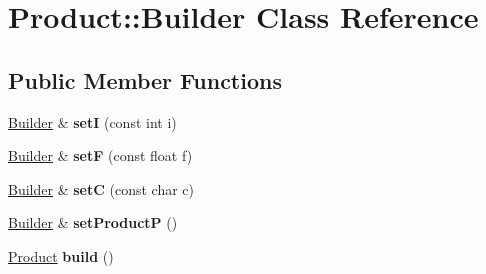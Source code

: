 \hypertarget{class_product_1_1_builder}{\section{Product\-:\-:Builder Class Reference}
\label{class_product_1_1_builder}
}
\subsection*{Public Member Functions}
\begin{DoxyCompactItemize}
\item 
\hypertarget{class_product_1_1_builder_a93ed1ba2502313a485756b7679f58f62}{\hyperlink{class_product_1_1_builder}{Builder} \& {\bfseries set\-I} (const int i)}\label{class_product_1_1_builder_a93ed1ba2502313a485756b7679f58f62}

\item 
\hypertarget{class_product_1_1_builder_ae806626bc173caeb7c2a9f8292a2b7a7}{\hyperlink{class_product_1_1_builder}{Builder} \& {\bfseries set\-F} (const float f)}\label{class_product_1_1_builder_ae806626bc173caeb7c2a9f8292a2b7a7}

\item 
\hypertarget{class_product_1_1_builder_ab5b5de3177e7ec7b8e7fafc8ac951942}{\hyperlink{class_product_1_1_builder}{Builder} \& {\bfseries set\-C} (const char c)}\label{class_product_1_1_builder_ab5b5de3177e7ec7b8e7fafc8ac951942}

\item 
\hypertarget{class_product_1_1_builder_aec19b8faff482995b662778fd204442f}{\hyperlink{class_product_1_1_builder}{Builder} \& {\bfseries set\-Product\-P} ()}\label{class_product_1_1_builder_aec19b8faff482995b662778fd204442f}

\item 
\hypertarget{class_product_1_1_builder_adfe69f8939ffb8a9fabdba9f90bdfda9}{\hyperlink{class_product}{Product} {\bfseries build} ()}\label{class_product_1_1_builder_adfe69f8939ffb8a9fabdba9f90bdfda9}

\end{DoxyCompactItemize}
